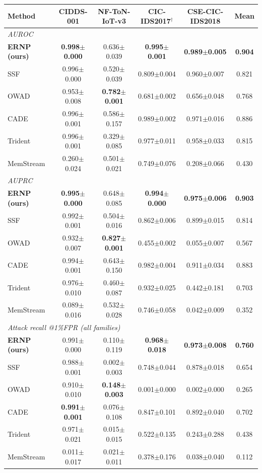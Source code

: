 \begin{tabular}{lccccc}
\toprule
Method & CIDDS-001 & NF-ToN-IoT-v3 & CIC-IDS2017$^\dagger$ & CSE-CIC-IDS2018 & Mean\\
\midrule
\multicolumn{6}{l}{\emph{AUROC}}\\
\textbf{ERNP (ours)} & \textbf{0.998$\pm$0.000} & 0.636$\pm$0.039 & \textbf{0.995$\pm$0.001} & \textbf{0.989$\pm$0.005} & \textbf{0.904}\\
SSF & 0.996$\pm$0.000 & 0.520$\pm$0.039 & 0.809$\pm$0.004 & 0.960$\pm$0.007 & 0.821\\
OWAD & 0.953$\pm$0.008 & \textbf{0.782$\pm$0.001} & 0.681$\pm$0.002 & 0.656$\pm$0.048 & 0.768\\
CADE & 0.996$\pm$0.001 & 0.586$\pm$0.157 & 0.989$\pm$0.002 & 0.971$\pm$0.016 & 0.886\\
Trident & 0.996$\pm$0.001 & 0.329$\pm$0.085 & 0.977$\pm$0.011 & 0.958$\pm$0.033 & 0.815\\
MemStream & 0.260$\pm$0.024 & 0.501$\pm$0.021 & 0.749$\pm$0.076 & 0.208$\pm$0.066 & 0.430\\
\midrule
\multicolumn{6}{l}{\emph{AUPRC}}\\
\textbf{ERNP (ours)} & \textbf{0.995$\pm$0.000} & 0.648$\pm$0.085 & \textbf{0.994$\pm$0.000} & \textbf{0.975$\pm$0.006} & \textbf{0.903}\\
SSF & 0.992$\pm$0.001 & 0.504$\pm$0.016 & 0.862$\pm$0.006 & 0.899$\pm$0.015 & 0.814\\
OWAD & 0.932$\pm$0.007 & \textbf{0.827$\pm$0.001} & 0.455$\pm$0.002 & 0.055$\pm$0.007 & 0.567\\
CADE & 0.994$\pm$0.001 & 0.643$\pm$0.150 & 0.982$\pm$0.004 & 0.911$\pm$0.034 & 0.883\\
Trident & 0.976$\pm$0.010 & 0.460$\pm$0.087 & 0.932$\pm$0.025 & 0.442$\pm$0.181 & 0.703\\
MemStream & 0.089$\pm$0.016 & 0.532$\pm$0.028 & 0.746$\pm$0.058 & 0.042$\pm$0.009 & 0.352\\
\midrule
\multicolumn{6}{l}{\emph{Attack recall @1\%FPR (all families)}}\\
\textbf{ERNP (ours)} & 0.991$\pm$0.000 & 0.110$\pm$0.119 & \textbf{0.968$\pm$0.018} & \textbf{0.973$\pm$0.008} & \textbf{0.760}\\
SSF & 0.988$\pm$0.001 & 0.002$\pm$0.003 & 0.748$\pm$0.044 & 0.878$\pm$0.018 & 0.654\\
OWAD & 0.910$\pm$0.010 & \textbf{0.148$\pm$0.003} & 0.001$\pm$0.000 & 0.002$\pm$0.000 & 0.265\\
CADE & \textbf{0.991$\pm$0.001} & 0.076$\pm$0.108 & 0.847$\pm$0.101 & 0.892$\pm$0.040 & 0.702\\
Trident & 0.971$\pm$0.021 & 0.015$\pm$0.015 & 0.522$\pm$0.135 & 0.243$\pm$0.288 & 0.438\\
MemStream & 0.011$\pm$0.017 & 0.021$\pm$0.011 & 0.378$\pm$0.176 & 0.038$\pm$0.040 & 0.112\\
\bottomrule
\end{tabular}
